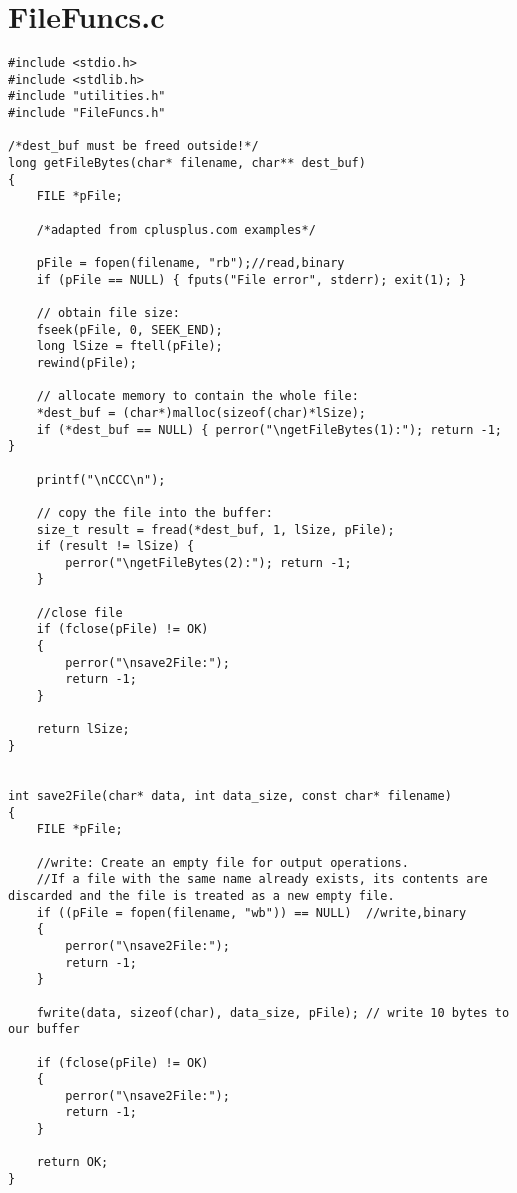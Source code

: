 \section{FileFuncs.c}
\label{FILEFUNCSC}

\begin{lstlisting}
#include <stdio.h>
#include <stdlib.h>
#include "utilities.h"
#include "FileFuncs.h"

/*dest_buf must be freed outside!*/
long getFileBytes(char* filename, char** dest_buf)
{
	FILE *pFile;

	/*adapted from cplusplus.com examples*/

	pFile = fopen(filename, "rb");//read,binary
	if (pFile == NULL) { fputs("File error", stderr); exit(1); }

	// obtain file size:
	fseek(pFile, 0, SEEK_END);
	long lSize = ftell(pFile);
	rewind(pFile);
	
	// allocate memory to contain the whole file:
	*dest_buf = (char*)malloc(sizeof(char)*lSize);
	if (*dest_buf == NULL) { perror("\ngetFileBytes(1):"); return -1; }

	printf("\nCCC\n");
	
	// copy the file into the buffer:
	size_t result = fread(*dest_buf, 1, lSize, pFile);
	if (result != lSize) {
		perror("\ngetFileBytes(2):"); return -1;
	}

	//close file
	if (fclose(pFile) != OK)
	{
		perror("\nsave2File:");
		return -1;
	}

	return lSize;
}


int save2File(char* data, int data_size, const char* filename)
{
	FILE *pFile;

	//write: Create an empty file for output operations.
	//If a file with the same name already exists, its contents are discarded and the file is treated as a new empty file.
	if ((pFile = fopen(filename, "wb")) == NULL)  //write,binary
	{
		perror("\nsave2File:");
		return -1;
	}

	fwrite(data, sizeof(char), data_size, pFile); // write 10 bytes to our buffer

	if (fclose(pFile) != OK)
	{
		perror("\nsave2File:");
		return -1;
	}

	return OK;
}

\end{lstlisting}